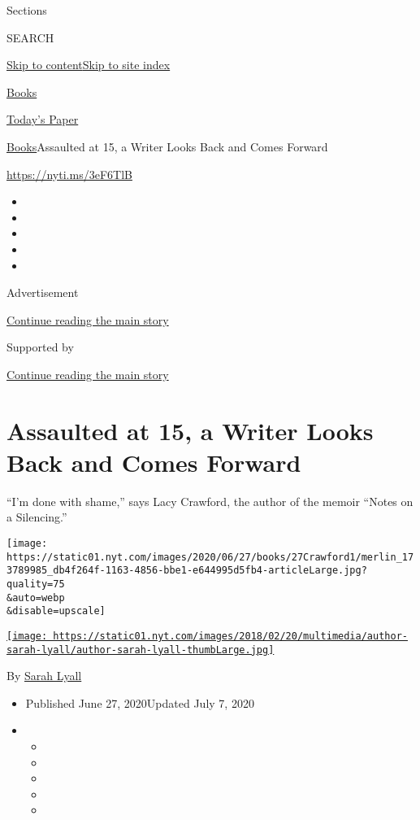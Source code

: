 Sections

SEARCH

\protect\hyperlink{site-content}{Skip to
content}\protect\hyperlink{site-index}{Skip to site index}

\href{https://www.nytimes.com/section/books}{Books}

\href{https://myaccount.nytimes.com/auth/login?response_type=cookie\&client_id=vi}{}

\href{https://www.nytimes.com/section/todayspaper}{Today's Paper}

\href{/section/books}{Books}\textbar{}Assaulted at 15, a Writer Looks
Back and Comes Forward

\url{https://nyti.ms/3eF6TlB}

\begin{itemize}
\item
\item
\item
\item
\item
\end{itemize}

Advertisement

\protect\hyperlink{after-top}{Continue reading the main story}

Supported by

\protect\hyperlink{after-sponsor}{Continue reading the main story}

\hypertarget{assaulted-at-15-a-writer-looks-back-and-comes-forward}{%
\section{Assaulted at 15, a Writer Looks Back and Comes
Forward}\label{assaulted-at-15-a-writer-looks-back-and-comes-forward}}

``I'm done with shame,'' says Lacy Crawford, the author of the memoir
``Notes on a Silencing.''

\texttt{[image: https://static01.nyt.com/images/2020/06/27/books/27Crawford1/merlin\_173789985\_db4f264f-1163-4856-bbe1-e644995d5fb4-articleLarge.jpg?quality=75\\\&auto=webp\\\&disable=upscale]}

\href{https://www.nytimes.com/by/sarah-lyall}{\texttt{[image: https://static01.nyt.com/images/2018/02/20/multimedia/author-sarah-lyall/author-sarah-lyall-thumbLarge.jpg]}}

By \href{https://www.nytimes.com/by/sarah-lyall}{Sarah Lyall}

\begin{itemize}
\item
  Published June 27, 2020Updated July 7, 2020
\item
  \begin{itemize}
  \item
  \item
  \item
  \item
  \item
  \end{itemize}
\end{itemize}

